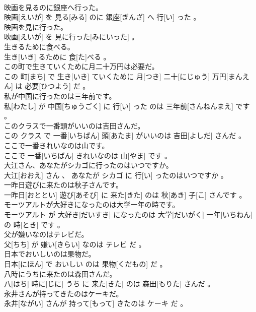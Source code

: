 \documentclass[8pt]{extreport}
\begin{document}
\begin{CJK}{UTF8}{min}
\\	映画を見るのに銀座へ行った。	
\\	映画[えいが] を 見る[みる] のに 銀座[ぎんざ] へ 行[い] った 。
\\	映画を見に行った。	
\\	映画[えいが] を 見に行った[みにいった] 。
\\	生きるために食べる。	
\\	生き[いき] るために 食[た]べる 。
\\	この町で生きていくために月二十万円は必要だ。	
\\	この 町[まち] で 生き[いき] ていくために 月[つき] 二十[にじゅう] 万円[まんえん] は 必要[ひつよう] だ 。
\\	私が中国に行ったのは三年前です。	
\\	私[わたし] が 中国[ちゅうごく] に 行[い] った のは 三年前[さんねんまえ] です 。
\\	このクラスで一番頭がいいのは吉田さんだ。	
\\	この クラス で 一番[いちばん] 頭[あたま] がいいのは 吉田[よしだ] さんだ 。
\\	ここで一番きれいなのは山です。	
\\	ここで 一番[いちばん] きれいなのは 山[やま] です 。
\\	大江さん、あなたがシカゴに行ったのはいつですか。	
\\	大江[おおえ] さん 、 あなたが シカゴ に 行[い] ったのはいつですか 。
\\	一昨日遊びに来たのは秋子さんです。	
\\	一昨日[おととい] 遊び[あそび] に 来た[きた] のは 秋[あき] 子[こ] さんです 。
\\	モーツアルトが大好きになったのは大学一年の時です。	
\\	モーツアルト が 大好き[だいすき] になったのは 大学[だいがく] 一年[いちねん] の 時[とき] です 。
\\	父が嫌いなのはテレビだ。	
\\	父[ちち] が 嫌い[きらい] なのは テレビ だ 。
\\	日本でおいしいのは果物だ。	
\\	日本[にほん] で おいしい のは 果物[くだもの] だ 。
\\	八時にうちに来たのは森田さんだ。	
\\	八[はち] 時に[じに] うち に 来た[きた] のは 森田[もりた] さんだ 。
\\	永井さんが持ってきたのはケーキだ。	
\\	永井[ながい] さんが 持って[もって] きたのは ケーキ だ 。

\end{CJK}
\end{document}

